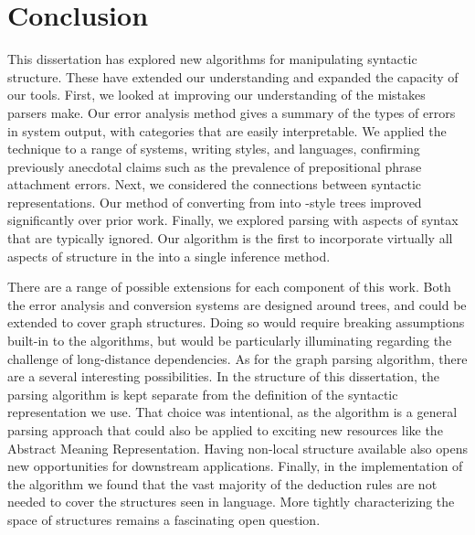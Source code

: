 \chapter{Conclusion}

This dissertation has explored new algorithms for manipulating syntactic structure.
These have extended our understanding and expanded the capacity of our tools.
First, we looked at improving our understanding of the mistakes parsers make.
Our error analysis method gives a summary of the types of errors in system output, with categories that are easily interpretable.
We applied the technique to a range of systems, writing styles, and languages, confirming previously anecdotal claims such as the prevalence of prepositional phrase attachment errors.
Next, we considered the connections between syntactic representations.
Our method of converting from \ccg into \ptb-style trees improved significantly over prior work.
Finally, we explored parsing with aspects of syntax that are typically ignored.
Our algorithm is the first to incorporate virtually all aspects of structure in the \ptb into a single inference method.

There are a range of possible extensions for each component of this work.
Both the error analysis and conversion systems are designed around trees, and could be extended to cover graph structures.
Doing so would require breaking assumptions built-in to the algorithms, but would be particularly illuminating regarding the challenge of long-distance dependencies.
As for the graph parsing algorithm, there are a several interesting possibilities.
In the structure of this dissertation, the parsing algorithm is kept separate from the definition of the syntactic representation we use.
That choice was intentional, as the algorithm is a general parsing approach that could also be applied to exciting new resources like the Abstract Meaning Representation.
Having non-local structure available also opens new opportunities for downstream applications.
Finally, in the implementation of the algorithm we found that the vast majority of the deduction rules are not needed to cover the structures seen in language.
More tightly characterizing the space of structures remains a fascinating open question.
